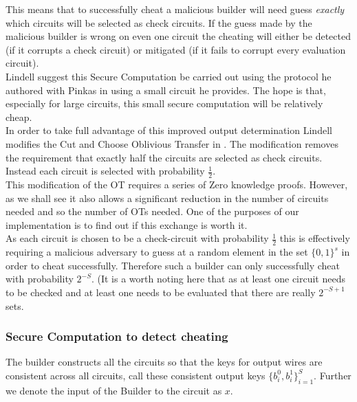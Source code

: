 \documentclass[ %
                    author={Nicholas Tutte},
                supervisor={Prof. Nigel Smart},
                    degree={MEng},
                     title={Secure Two Party Computation},
                  subtitle={A practical comparison of recent protocols},
                      type={Research - GG1K},
                      year={2015} ]{dissertation}
\begin{document}
				This means that to successfully cheat a malicious builder will need guess \emph{exactly} which circuits will be selected as check circuits. If the guess made by the malicious builder is wrong on even one circuit the cheating will either be detected (if it corrupts a check circuit) or mitigated (if it fails to corrupt every evaluation circuit).\\

				Lindell suggest this Secure Computation be carried out using the protocol he authored with Pinkas in \cite{LindellAndPinkas2011} using a small circuit he provides. The hope is that, especially for large circuits, this small secure computation will be relatively cheap.\\

				In order to take full advantage of this improved output determination Lindell modifies the Cut and Choose Oblivious Transfer in \cite{LindellAndPinkas2011}. The modification removes the requirement that exactly half the circuits are selected as check circuits. Instead each circuit is selected with probability $\frac{1}{2}$.\\

				This modification of the OT requires a series of Zero knowledge proofs. However, as we shall see it also allows a significant reduction in the number of circuits needed and so the number of OTs needed. One of the purposes of our implementation is to find out if this exchange is worth it.\\

				As each circuit is chosen to be a check-circuit with probability $\frac{1}{2}$ this is effectively requiring a malicious adversary to guess at a random element in the set $\{0, 1\}^s$ in order to cheat successfully. Therefore such a builder can only successfully cheat with probability $2^{-S}$. (It is a worth noting here that as at least one circuit needs to be checked and at least one needs to be evaluated that there are really $2^{-S+1}$ sets.\\

				\subsubsection{Secure Computation to detect cheating}
					The builder constructs all the circuits so that the keys for output wires are consistent across all circuits, call these consistent output keys $\{b_i^0, b_i^1\}_{i = 1}^{S}$. Further we denote the input of the Builder to the circuit as $x$.\\
\end{document}
